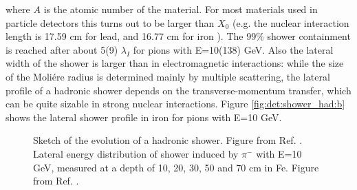 \noindent where $A$ is the atomic number of the material. For most materials used in particle detectors this turns out to be larger than $X_0$ (e.g. the nuclear interaction length is 17.59 cm for lead, and 16.77 cm for iron \cite{Patrignani:2016xqp}). The 99\% shower containment is reached after about 5(9) $\lambda_I$ for pions with E=10(138) GeV. Also the lateral width of the shower is larger than in electromagnetic interactions: while the size of the Moli\'ere radius is determined mainly by multiple scattering, the lateral profile of a hadronic shower depends on the transverse-momentum transfer, which can be quite sizable in strong nuclear interactions. Figure \ref{fig:det:shower_had:b} shows the lateral shower profile in iron for pions with E=10 GeV.

\begin{figure}[ht]
\centering
{}
\caption{ Sketch of the evolution of a hadronic shower. Figure from Ref. \cite{grupen_shwartz_2008}. 
 Lateral energy distribution of shower induced by $\pi^-$ with E=10 GeV, measured at a depth of 10, 20, 30, 50 and 70 cm in Fe. Figure from Ref. \cite{FRIEND1976505}.}
\label{fig:det:shower_had}
\end{figure}


